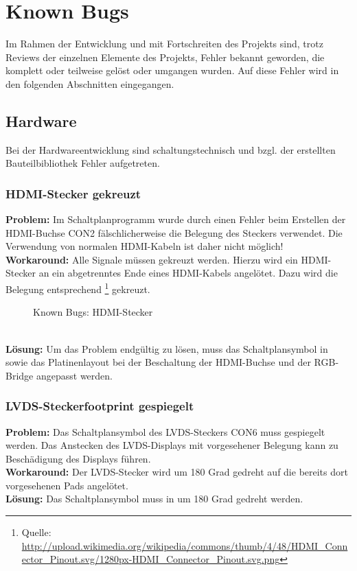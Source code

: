 \section{Known Bugs}
Im Rahmen der Entwicklung und mit Fortschreiten des Projekts sind, trotz Reviews der einzelnen Elemente des Projekts, Fehler bekannt geworden, die komplett oder teilweise gelöst oder umgangen wurden. Auf diese Fehler wird in den folgenden Abschnitten eingegangen.
\subsection{Hardware}
Bei der Hardwareentwicklung sind schaltungstechnisch und bzgl. der erstellten Bauteilbibliothek Fehler aufgetreten. 
\subsubsection{HDMI-Stecker gekreuzt}
\textbf{Problem:} Im Schaltplanprogramm  wurde durch einen Fehler beim Erstellen der HDMI-Buchse CON2 fälschlicherweise die Belegung des Steckers verwendet. Die Verwendung von normalen HDMI-Kabeln ist daher nicht möglich!\\
\textbf{Workaround:} Alle Signale müssen gekreuzt werden. Hierzu wird ein HDMI-Stecker an ein abgetrenntes Ende eines HDMI-Kabels angelötet. Dazu wird die Belegung entsprechend \footnote{Quelle: \url{http://upload.wikimedia.org/wikipedia/commons/thumb/4/48/HDMI_Connector_Pinout.svg/1280px-HDMI_Connector_Pinout.svg.png}} gekreuzt.
\begin{figure}[htp]
	\center
    \caption{Known Bugs: HDMI-Stecker}
    \label{fig:hdmi_stecker_problem}
\end{figure}\\
\textbf{Lösung:} Um das Problem endgültig zu lösen, muss das Schaltplansymbol in  sowie das Platinenlayout bei der Beschaltung der HDMI-Buchse und der RGB-Bridge angepasst werden.
\subsubsection{LVDS-Steckerfootprint gespiegelt}
\textbf{Problem:} Das Schaltplansymbol des LVDS-Steckers CON6 muss gespiegelt werden. Das Anstecken des LVDS-Displays mit vorgesehener Belegung kann zu Beschädigung des Displays führen.\\
\textbf{Workaround:} Der LVDS-Stecker wird um 180 Grad gedreht auf die bereits dort vorgesehenen Pads angelötet.\\
\textbf{Lösung:} Das Schaltplansymbol muss in  um 180 Grad gedreht werden.
